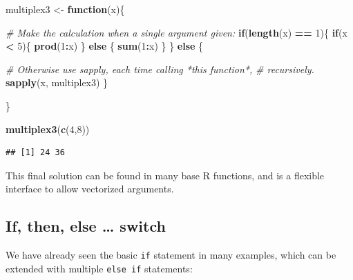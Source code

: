 \documentclass[]{book}
\newenvironment{Shaded}{\begin{snugshade}}{\end{snugshade}}
\newcommand{\CommentTok}[1]{\textcolor[rgb]{0.56,0.35,0.01}{\textit{#1}}}
\newcommand{\ControlFlowTok}[1]{\textcolor[rgb]{0.13,0.29,0.53}{\textbf{#1}}}
\newcommand{\DecValTok}[1]{\textcolor[rgb]{0.00,0.00,0.81}{#1}}
\newcommand{\KeywordTok}[1]{\textcolor[rgb]{0.13,0.29,0.53}{\textbf{#1}}}
\newcommand{\NormalTok}[1]{#1}
\newcommand{\OperatorTok}[1]{\textcolor[rgb]{0.81,0.36,0.00}{\textbf{#1}}}
\newcommand{\StringTok}[1]{\textcolor[rgb]{0.31,0.60,0.02}{#1}}
\begin{document}
\begin{Shaded}
\begin{Highlighting}[]
\NormalTok{multiplex3 <-}\StringTok{ }\ControlFlowTok{function}\NormalTok{(x)\{}
  
  \CommentTok{# Make the calculation when a single argument given:}
  \ControlFlowTok{if}\NormalTok{(}\KeywordTok{length}\NormalTok{(x) }\OperatorTok{==}\StringTok{ }\DecValTok{1}\NormalTok{)\{}
    \ControlFlowTok{if}\NormalTok{(x }\OperatorTok{<}\StringTok{ }\DecValTok{5}\NormalTok{)\{}
      \KeywordTok{prod}\NormalTok{(}\DecValTok{1}\OperatorTok{:}\NormalTok{x)}
\NormalTok{    \} }\ControlFlowTok{else}\NormalTok{ \{}
      \KeywordTok{sum}\NormalTok{(}\DecValTok{1}\OperatorTok{:}\NormalTok{x)}
\NormalTok{    \}  }
\NormalTok{  \} }\ControlFlowTok{else}\NormalTok{ \{}
    
    \CommentTok{# Otherwise use sapply, each time calling *this function*,}
    \CommentTok{# recursively.}
    \KeywordTok{sapply}\NormalTok{(x, multiplex3)}
\NormalTok{  \}}
  
\NormalTok{\}}

\KeywordTok{multiplex3}\NormalTok{(}\KeywordTok{c}\NormalTok{(}\DecValTok{4}\NormalTok{,}\DecValTok{8}\NormalTok{))}
\end{Highlighting}
\end{Shaded}

\begin{verbatim}
## [1] 24 36
\end{verbatim}

This final solution can be found in many base R functions, and is a flexible interface to allow vectorized arguments.

\hypertarget{if-then-else-switch}{%
\subsection{If, then, else \ldots{} switch}\label{if-then-else-switch}}

We have already seen the basic \texttt{if} statement in many examples, which can be extended with multiple \texttt{else\ if} statements:
\end{document}
